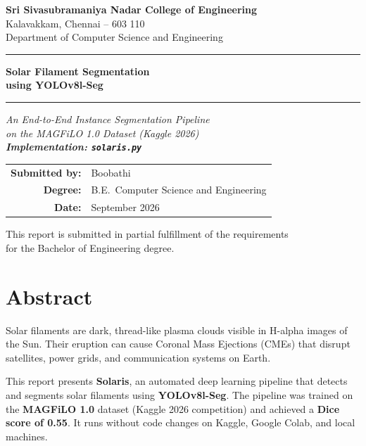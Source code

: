 \documentclass[12pt,a4paper,openany]{report}
\begin{document}
\begin{titlepage}
\centering
\vspace*{0.5cm}
{\large\textbf{Sri Sivasubramaniya Nadar College of Engineering}\\
Kalavakkam, Chennai -- 603 110\\
Department of Computer Science and Engineering}
\vspace{0.8cm}
\rule{\linewidth}{1.5pt}\vspace{0.4cm}
{\Huge\bfseries\color{ssnblue}Solar Filament Segmentation\\[6pt]using YOLOv8l-Seg\par}
\vspace{0.4cm}\rule{\linewidth}{0.8pt}\vspace{0.5cm}
{\large\itshape An End-to-End Instance Segmentation Pipeline\\
on the MAGFiLO 1.0 Dataset (Kaggle 2026)\\[4pt]
\textbf{Implementation: \texttt{solaris.py}}}
\vspace{1.2cm}
\begin{tabular}{rl}
\textbf{Submitted by:} & Boobathi \\[4pt]
\textbf{Degree:}       & B.E.\ Computer Science and Engineering \\[4pt]
\textbf{Date:}         & September 2026 \\
\end{tabular}
\vfill
\begin{mdframed}[backgroundcolor=ssnblue!10,linecolor=ssnblue,linewidth=1pt,roundcorner=4pt]
\centering\small
This report is submitted in partial fulfillment of the requirements\\
for the Bachelor of Engineering degree.
\end{mdframed}
\end{titlepage}

\chapter*{Abstract}
\thispagestyle{fancy}
Solar filaments are dark, thread-like plasma clouds visible in H-alpha images of the Sun.
Their eruption can cause Coronal Mass Ejections (CMEs) that disrupt satellites, power grids,
and communication systems on Earth.

This report presents \textbf{Solaris}, an automated deep learning pipeline that detects and
segments solar filaments using \textbf{YOLOv8l-Seg}. The pipeline was trained on the
\textbf{MAGFiLO 1.0} dataset (Kaggle 2026 competition) and achieved a \textbf{Dice score
of 0.55}. It runs without code changes on Kaggle, Google Colab, and local machines.
\end{document}
